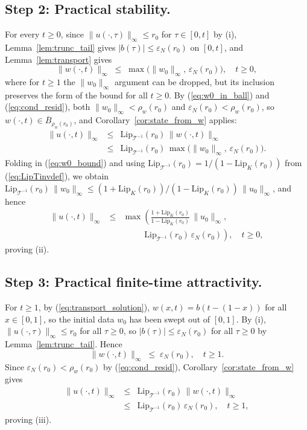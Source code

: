 \documentclass[amsthm]{autart}
\theoremstyle{plain}
\theoremstyle{definition}
\newcommand{\Tcal}{\mathcal{T}}
\newcommand{\Lipk}{\mathrm{Lip}_K}
\newcommand{\LipT}{\mathrm{Lip}_{\Tcal^{-1}}}
\newcommand{\Bball}{\overline{B}}
\newcommand{\eps}{\varepsilon}
\begin{document}
\subsection*{Step 2: Practical stability.}

For every $t \ge 0$, since $\|u(\cdot,\tau)\|_\infty \le r_0$ for $\tau \in [0,t]$ by (i), Lemma~\ref{lem:trunc_tail} gives $|b(\tau)| \le \eps_N(r_0)$ on $[0,t]$, and Lemma~\ref{lem:transport} gives
\begin{equation}
\|w(\cdot, t)\|_\infty \;\le\; \max\bigl(\|w_0\|_\infty,\, \eps_N(r_0)\bigr), \quad t \ge 0,
\label{eq:wnorm_allt}
\end{equation}
where for $t \ge 1$ the $\|w_0\|_\infty$ argument can be dropped, but its inclusion preserves the form of the bound for all $t \ge 0$. By (\ref{eq:w0_in_ball}) and (\ref{eq:cond_resid}), both $\|w_0\|_\infty < \rho_w(r_0)$ and $\eps_N(r_0) < \rho_w(r_0)$, so $w(\cdot, t) \in \Bball_{\rho_w(r_0)}$, and Corollary~\ref{cor:state_from_w} applies:
\begin{eqnarray}
\|u(\cdot, t)\|_\infty &\le& \LipT(r_0)\,\|w(\cdot, t)\|_\infty \nonumber \\
&\le& \LipT(r_0)\,\max\bigl(\|w_0\|_\infty,\, \eps_N(r_0)\bigr).
\label{eq:proof_ii_w}
\end{eqnarray}
Folding in (\ref{eq:w0_bound}) and using $\LipT(r_0) = 1/(1-\Lipk(r_0))$ from (\ref{eq:LipTinvdef}), we obtain $\LipT(r_0)\,\|w_0\|_\infty \le (1+\Lipk(r_0))/(1-\Lipk(r_0))\,\|u_0\|_\infty$, and hence
\begin{eqnarray}
\|u(\cdot, t)\|_\infty &\le& \max\!\left(\frac{1 + \Lipk(r_0)}{1 - \Lipk(r_0)}\,\|u_0\|_\infty,\right. \nonumber \\
&& \quad\quad\;\; \left.\LipT(r_0)\,\eps_N(r_0)\right), \quad t \ge 0,
\label{eq:proof_ii}
\end{eqnarray}
proving (ii).

\subsection*{Step 3: Practical finite-time attractivity.}

For $t \ge 1$, by (\ref{eq:transport_solution}), $w(x, t) = b(t - (1-x))$ for all $x \in [0,1]$, so the initial data $w_0$ has been swept out of $[0,1]$. By (i), $\|u(\cdot, \tau)\|_\infty \le r_0$ for all $\tau \ge 0$, so $|b(\tau)| \le \eps_N(r_0)$ for all $\tau \ge 0$ by Lemma~\ref{lem:trunc_tail}. Hence
\begin{equation}
\|w(\cdot, t)\|_\infty \;\le\; \eps_N(r_0), \quad t \ge 1.
\label{eq:wnorm_t1}
\end{equation}
Since $\eps_N(r_0) < \rho_w(r_0)$ by (\ref{eq:cond_resid}), Corollary~\ref{cor:state_from_w} gives
\begin{eqnarray}
\|u(\cdot, t)\|_\infty &\le& \LipT(r_0)\,\|w(\cdot, t)\|_\infty \nonumber \\
&\le& \LipT(r_0)\,\eps_N(r_0), \quad t \ge 1,
\label{eq:proof_iii}
\end{eqnarray}
proving (iii).
\end{document}
